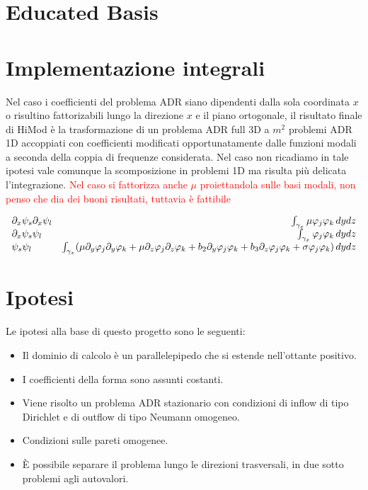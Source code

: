 
\section{Educated Basis}
\section{Implementazione integrali}

Nel caso i coefficienti del problema ADR siano dipendenti dalla sola coordinata $x$ o risultino fattorizabili lungo la direzione $x$ e il piano ortogonale, il risultato finale di HiMod \`e la trasformazione di un problema ADR full 3D a $m^2$ problemi ADR 1D accoppiati con coefficienti modificati opportunatamente dalle funzioni modali a seconda della coppia di frequenze considerata. Nel caso non ricadiamo in tale ipotesi vale comunque la scomposizione in problemi 1D ma risulta pi\`u delicata l'integrazione.
\textcolor{red}{Nel caso si fattorizza anche $\mu$ proiettandola sulle basi modali, non penso che dia dei buoni risultati, tuttavia \`e fattibile}

\begin{equation}
\begin{array}{l r}
\partial_x\psi_s\partial_x\psi_l & \int_{\gamma_x} \mu\varphi_j\varphi_k\,dydz \\
\partial_x\psi_s\psi_l & \int_{\gamma_x}\varphi_j\varphi_k\,dydz\\
\psi_s\psi_l & \int_{\gamma_x}(\mu\partial_y\varphi _j\partial_y\varphi _k + \mu\partial_z\varphi _j\partial_z\varphi _k + b_2\partial_y\varphi_j\varphi_k +b_3\partial_z\varphi_j\varphi_k + \sigma\varphi_j\varphi_k)\,dydz
\end{array}
\end{equation}

\section{Ipotesi}

Le ipotesi alla base di questo progetto sono le seguenti:

\begin{itemize}
\item Il dominio di calcolo \`e un parallelepipedo che si estende nell'ottante positivo.
\item I coefficienti della forma sono assunti costanti.
\item Viene risolto un problema ADR stazionario con condizioni di inflow di tipo Dirichlet e di outflow di tipo Neumann omogeneo.
\item Condizioni sulle pareti omogenee.
\item \`E possibile separare il problema lungo le direzioni trasversali, in due sotto problemi agli autovalori.
\end{itemize}

